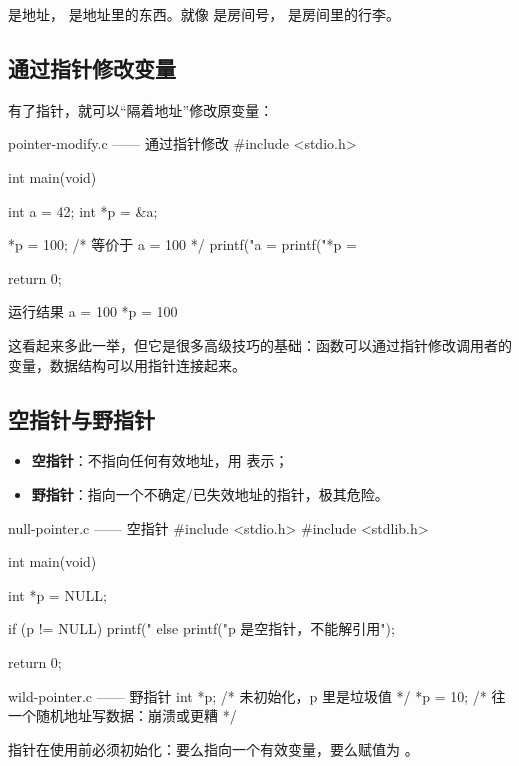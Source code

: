 \begin{tipbox}[一句话记住]
 是地址， 是地址里的东西。就像  是房间号， 是房间里的行李。
\end{tipbox}

\subsection{通过指针修改变量}

有了指针，就可以“隔着地址”修改原变量：

\begin{codebox}{pointer-modify.c —— 通过指针修改}
#include <stdio.h>

int main(void)
{
    int a = 42;
    int *p = &a;

    *p = 100;       /* 等价于 a = 100 */
    printf("a = %
    printf("*p = %

    return 0;
}
\end{codebox}

\begin{outbox}{运行结果}
a = 100
*p = 100
\end{outbox}

这看起来多此一举，但它是很多高级技巧的基础：函数可以通过指针修改调用者的变量，数据结构可以用指针连接起来。

\subsection{空指针与野指针}

\begin{itemize}
  \item \textbf{空指针}：不指向任何有效地址，用  表示；
  \item \textbf{野指针}：指向一个不确定/已失效地址的指针，极其危险。
\end{itemize}

\begin{codebox}{null-pointer.c —— 空指针}
#include <stdio.h>
#include <stdlib.h>

int main(void)
{
    int *p = NULL;

    if (p != NULL) {
        printf("%
    } else {
        printf("p 是空指针，不能解引用\n");
    }

    return 0;
}
\end{codebox}

\begin{pitfall}[野指针]
\begin{codebox}{wild-pointer.c —— 野指针}
int *p;         /* 未初始化，p 里是垃圾值 */
*p = 10;        /* 往一个随机地址写数据：崩溃或更糟 */
\end{codebox}
指针在使用前必须初始化：要么指向一个有效变量，要么赋值为 。
\end{pitfall}

